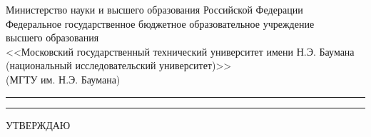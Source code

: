 
\begin{titlepage}
\singlespacing
\thispagestyle{empty}

\ifx\wauthor\undefined\providecommand{\wauthorspace}{\vspace{7pt}}\fi

\providecommand{\wauthorspace}{}
\providecommand{\wtype}
{{\huge ЗАДАНИЕ}

\bigskip

{\LARGE
на выполнение курсового проекта
}

\bigskip
}
\providecommand{\wauthor}{}
\providecommand{\wgroup}{}
\providecommand{\wfirstlead}{}
\providecommand{\wleadprefix}{Руководитель курсового проекта}



\begin{minipage}{\textwidth}
\fontsize{10}{15}
\centering
\bfseries

Министерство науки и высшего образования Российской
Федерации\\

Федеральное государственное бюджетное образовательное учреждение\\

высшего образования\\

<<Московский государственный технический университет
имени Н.Э. Баумана\\

(национальный исследовательский университет)>>\\

(МГТУ им. Н.Э. Баумана)\\

\end{minipage}

{\vspace{5pt}
\rule{\linewidth}{3pt}

\par
\rule[20pt]{\linewidth}{1pt}
\vspace{-2em}
}

\begin{adjustbox}{minipage=0.4\textwidth,valign=T,right}
        \footnotesize
    \centering
    УТВЕРЖДАЮ


\end{adjustbox}
\end{titlepage}
